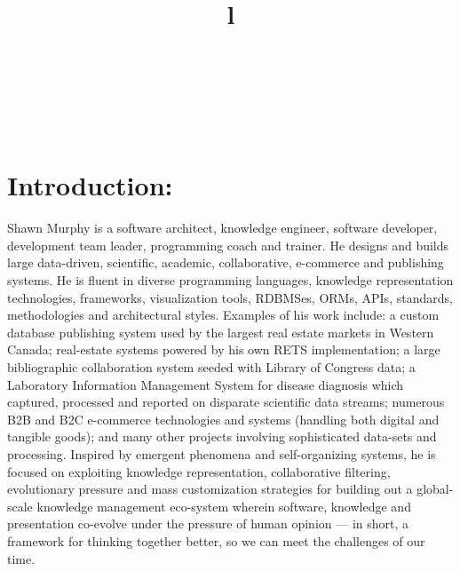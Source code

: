 \resumewidth=7in
\begin{resume}


\begin{format}
\title{l}\\
\\
\body\\
\end{format}


\section{Introduction:}
\begin{par}

Shawn Murphy is a software architect, knowledge engineer,
software developer, development team leader, programming coach
and trainer.
He designs and builds large data-driven, scientific, academic, 
collaborative, e-commerce and publishing systems. 
He is fluent in diverse programming languages, knowledge
representation technologies, frameworks, visualization tools, RDBMSes,
ORMs, APIs, standards, methodologies and architectural styles. 
Examples of his work include:
  a custom database publishing system used by the largest real estate
    markets in Western Canada;
  real-estate systems powered by his own RETS implementation; 
  a large bibliographic collaboration system seeded with Library of Congress data; 
  a Laboratory Information Management System for disease diagnosis which 
    captured, processed and reported on disparate scientific data streams; 
  numerous B2B and B2C e-commerce technologies and systems 
    (handling both digital and tangible goods);
  and many other projects involving sophisticated data-sets and processing. 
Inspired by emergent phenomena and
self-organizing systems, he is focused on exploiting knowledge
representation, collaborative filtering, evolutionary pressure and
mass customization strategies for building out a global-scale
knowledge management eco-system wherein software, knowledge and presentation
co-evolve under the pressure of human opinion --– in short, a framework for 
thinking together better, so we can meet the challenges of our time.

\end{par}






\end{resume}
